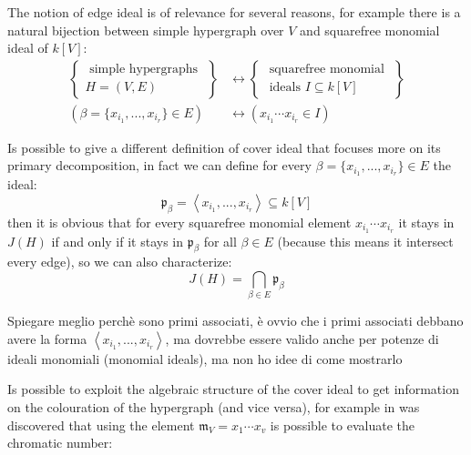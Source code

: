 \documentclass[a4wide]{book}
\theoremstyle{plain}
\theoremstyle{remark}
\theoremstyle{definition}
\newcommand{\p}{\mathfrak{p}}
\newcommand{\mm}{\mathfrak{m}}
\begin{document}
The notion of edge ideal is of relevance for several reasons, for example there is a natural bijection between simple hypergraph over $ V $ and squarefree monomial ideal of $ k[V] $:
\begin{align*} \label{eq:bij}
\left\{\begin{array}{c}
\text { simple hypergraphs } \\
H=(V, E)
\end{array}\right\}
&  \leftrightarrow\left 
\{\begin{array}{c}
\text { squarefree monomial } \\
\text { ideals } I \subseteq k\left[V \right]
\end{array}\right\} \\
(\beta = \{ x_{i_1} , ... , x_{i_r}\} \in E )
&  \leftrightarrow  
(x_{i_1} \cdots x_{i_r} \in I)
\end{align*}


Is possible to give a different definition of cover ideal that focuses more on its primary decomposition, in fact we can define for every $ \beta = \{ x_{i_1} , ... , x_{i_r}\} \in E  $ the ideal:
\begin{equation}\label{eq:prime}
\p_\beta = \left\langle  x_{i_1} , ... , x_{i_r} \right\rangle \subseteq k[V]
\end{equation}
then it is obvious that for every squarefree monomial element $ x_{i_1} \cdots x_{i_r} $ it stays in $ J(H) $ if and only if it stays in $ \p_\beta $ for all $ \beta \in E $ (because this means it intersect every edge), so we can also characterize: 
\begin{equation}\label{eq:coverideal2}
J(H) = \bigcap_{\beta \in E} \p_\beta
\end{equation}

\begin{tboxtodo}
Spiegare meglio perchè sono primi associati, è ovvio che i primi associati debbano avere la forma $  \left\langle  x_{i_1} , ... , x_{i_r} \right\rangle $, ma dovrebbe essere valido anche per potenze di ideali monomiali (monomial ideals), ma non ho idee di come mostrarlo
\end{tboxtodo}



Is possible to exploit the algebraic structure of the cover ideal to get information on the colouration of the hypergraph (and vice versa), for example in \cite{Fran10Colourings} was discovered that using the element $  \mm_V = x_1 \cdots x_v  $ is possible to evaluate the chromatic number:
\end{document}
